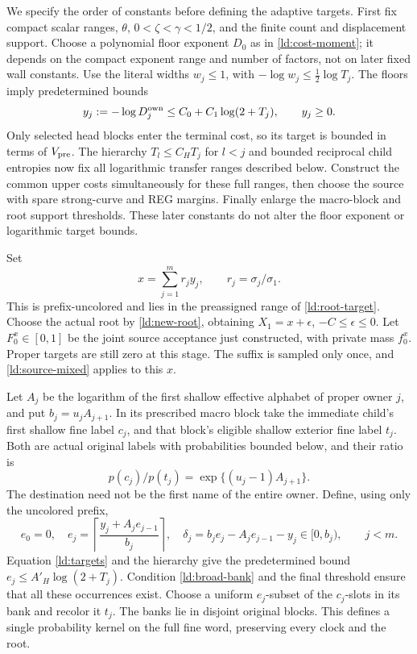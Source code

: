 We specify the order of constants before defining the adaptive targets.
First fix compact scalar ranges, \(\theta\), \(0<\zeta<\gamma<1/2\),
and the finite count and displacement support.  Choose a polynomial
floor exponent \(D_0\) as in \eqref{ld:cost-moment}; it depends on
the compact exponent range and number of factors, not on later fixed
wall constants.  Use the literal widths \(w_j\le1\), with
\(-\log w_j\le\tfrac12\log T_j\).  The floors imply predetermined
bounds
\begin{equation}
 y_j:=-\log D_j^{\rm own}\le C_0+C_1\log(2+T_j),\qquad
 y_j\ge0.
 \label{ld:targets}
\end{equation}
Only selected head blocks enter the terminal cost, so its target
is bounded in terms of \(V_{\rm pre}\).  The hierarchy
\(T_l\le C_HT_j\) for \(l<j\) and bounded reciprocal child
entropies now fix all logarithmic transfer ranges described below.
Construct the common upper costs simultaneously for these full ranges,
then choose the source with spare strong-curve and REG margins.
Finally enlarge the macro-block and root support thresholds.  These
later constants do not alter the floor exponent or logarithmic target
bounds.

Set
\begin{equation}
 x=\sum_{j=1}^m r_jy_j,\qquad r_j=\sigma_j/\sigma_1.
 \label{ld:common-target}
\end{equation}
This is prefix-uncolored and lies in the preassigned range of
\eqref{ld:root-target}.  Choose the actual root by
\eqref{ld:new-root}, obtaining \(X_1=x+\epsilon\),
\(-C\le\epsilon\le0\).  Let \(F_0^x\in[0,1]\) be the joint
source acceptance just constructed, with private mass \(f_0^x\).
Proper targets are still zero at this stage.  The suffix is sampled
only once, and \eqref{ld:source-mixed} applies to this \(x\).

Let \(A_j\) be the logarithm of the first shallow effective
alphabet of proper owner \(j\), and put
\(b_j=u_jA_{j+1}\).  In its prescribed macro block take the
immediate child's first shallow fine label \(c_j\), and that
block's eligible shallow exterior fine label \(t_j\).  Both are
actual original labels with probabilities bounded below, and their
ratio is
\[
 p(c_j)/p(t_j)=\exp\{(u_j-1)A_{j+1}\}.
\]
The destination need not be the first name of the entire owner.
Define, using only the uncolored prefix,
\begin{equation}
 e_0=0,\quad
 e_j=\left\lceil\frac{y_j+A_je_{j-1}}{b_j}\right\rceil,\quad
 \delta_j=b_je_j-A_je_{j-1}-y_j\in[0,b_j),\qquad j<m.
 \label{ld:cascade}
\end{equation}
Equation \eqref{ld:targets} and the hierarchy give the predetermined
bound \(e_j\le A'_H\log(2+T_j)\).  Condition
\eqref{ld:broad-bank} and the final threshold ensure that all these
occurrences exist.  Choose a uniform \(e_j\)-subset of the
\(c_j\)-slots in its bank and recolor it \(t_j\).  The banks lie
in disjoint original blocks.  This defines a single probability
kernel on the full fine word, preserving every clock and the root.

